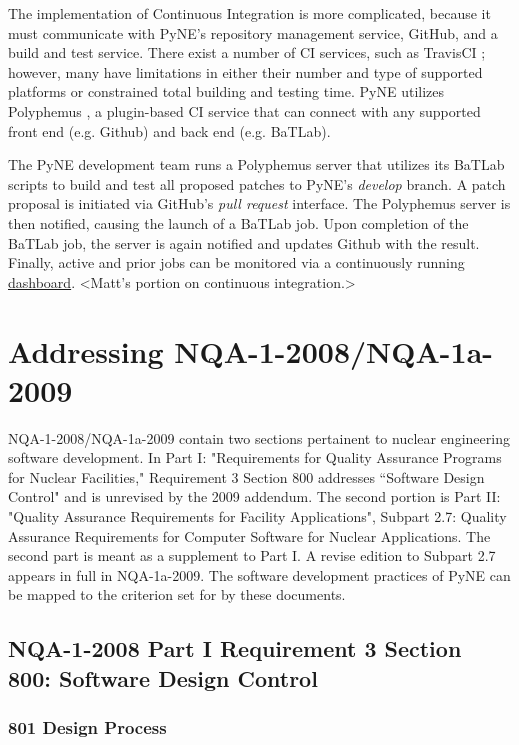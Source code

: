 \documentclass{anstrans}
\begin{document}
The implementation of Continuous Integration is more complicated, because it
must communicate with PyNE's repository management service, GitHub, and a build
and test service. There exist a number of CI services, such as TravisCI
\cite{travis_2014}; however, many have limitations in either their number and
type of supported platforms or constrained total building and testing time. PyNE
utilizes Polyphemus \cite{polyphemus_2014}, a plugin-based CI service that can
connect with any supported front end (e.g. Github) and back end (e.g. BaTLab).

The PyNE development team runs a Polyphemus server that utilizes its BaTLab
scripts to build and test all proposed patches to PyNE's \textit{develop}
branch. A patch proposal is initiated via GitHub's \textit{pull request}
interface. The Polyphemus server is then notified, causing the launch of a
BaTLab job. Upon completion of the BaTLab job, the server is again notified and
updates Github with the result. Finally, active and prior jobs can be monitored
via a continuously running \href{http://gorgus.pyne.io/dashboard}{dashboard}.
<Matt's portion on continuous integration.>


\section{Addressing NQA-1-2008/NQA-1a-2009}

NQA-1-2008/NQA-1a-2009 contain two sections pertainent to nuclear engineering
software development. In Part I: "Requirements for Quality Assurance Programs
for Nuclear Facilities," Requirement 3 Section 800 addresses ``Software Design
Control" and is unrevised by the 2009 addendum. The second portion is Part II:
"Quality Assurance Requirements for Facility Applications", Subpart 2.7:
Quality Assurance Requirements for Computer Software for Nuclear Applications.
The second part is meant as a supplement to Part I. A revise edition to Subpart
2.7 appears in full in NQA-1a-2009. The software development practices of PyNE
can be mapped to the criterion set for by these documents.


\subsection{NQA-1-2008 Part I Requirement 3 Section 800: Software Design Control}

\subsubsection{801 Design Process}
\end{document}
